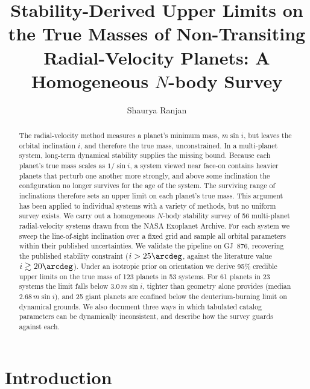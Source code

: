 \documentclass[twocolumn]{aastex631}
\newcommand{\msini}{m\sin i}
\begin{document}
\title{Stability-Derived Upper Limits on the True Masses of Non-Transiting
Radial-Velocity Planets: A Homogeneous $N$-body Survey}

\author{Shaurya Ranjan}

\begin{abstract}
The radial-velocity method measures a planet's minimum mass, $\msini$, but
leaves the orbital inclination $i$, and therefore the true mass,
unconstrained. In a multi-planet system, long-term dynamical stability
supplies the missing bound. Because each planet's true mass scales as
$1/\sin i$, a system viewed near face-on contains heavier planets that
perturb one another more strongly, and above some inclination the
configuration no longer survives for the age of the system. The surviving
range of inclinations therefore sets an upper limit on each planet's true
mass. This argument has been applied to individual systems with a variety
of methods, but no uniform survey exists. We carry out a homogeneous
$N$-body stability survey of 56 multi-planet radial-velocity systems drawn
from the NASA Exoplanet Archive. For each system we sweep the
line-of-sight inclination over a fixed grid and sample all orbital
parameters within their published uncertainties. We validate the pipeline
on GJ~876, recovering the published stability constraint ($i > 25\arcdeg$,
against the literature value $i \gtrsim 20\arcdeg$). Under an isotropic
prior on orientation we derive 95\% credible upper limits on the true mass
of 123 planets in 53 systems. For 61 planets in 23 systems the limit falls
below $3.0\,\msini$, tighter than geometry alone provides (median
$2.68\,\msini$), and 25 giant planets are confined below the
deuterium-burning limit on dynamical grounds. We also document three ways
in which tabulated catalog parameters can be dynamically inconsistent, and
describe how the survey guards against each.
\end{abstract}


\section{Introduction} \label{sec:intro}
\end{document}
